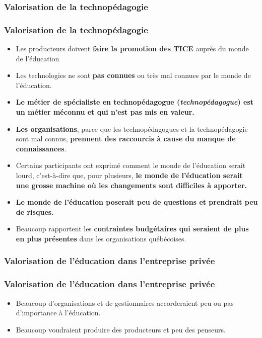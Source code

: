 				\subsubsection{Valorisation de la technopédagogie} 
						\begin{frame}[allowframebreaks]
						\frametitle{Valorisation de la technopédagogie}
                        			
                        			\begin{itemize}
                        			\item Les producteurs doivent \textbf{faire la promotion des TICE} auprès du monde de l’éducation
                        			\item Les technologies ne sont \textbf{pas connues} ou très mal connues par le monde de l’éducation. 
                        			\item \textbf{Le métier de spécialiste en technopédagogue (\textit{technopédagogue}) est un métier méconnu et qui n’est pas mis en valeur. }
                        			\item \textbf{Les organisations}, parce que les technopédagogues et la technopédagogie sont mal connus, \textbf{prennent des raccourcis à cause du manque de connaissances}. 
                        			\item Certains participants ont exprimé comment le monde de l’éducation serait lourd, c’est-à-dire que, pour plusieurs, \textbf{le monde de l’éducation serait une grosse machine où les changements sont difficiles à apporter. }
                        			\item \textbf{Le monde de l’éducation poserait peu de questions et prendrait peu de risques.} 
                        			\item Beaucoup rapportent les \textbf{contraintes budgétaires qui seraient de plus en plus présentes} dans les organisations québécoises. 
						\end{itemize}
						
						\end{frame}	
						
					\subsubsection{Valorisation de l'éducation dans l'entreprise privée} 
						\begin{frame}[allowframebreaks]
						\frametitle{Valorisation de l'éducation dans l'entreprise privée}
                        			
                        			\begin{itemize}
                        			\item Beaucoup d’organisations et de gestionnaires accorderaient peu ou pas d’importance à l’éducation. 
                        			\item Beaucoup voudraient produire des producteurs et peu des penseurs. 
                        			
						\end{itemize}
						\end{frame}	
						
